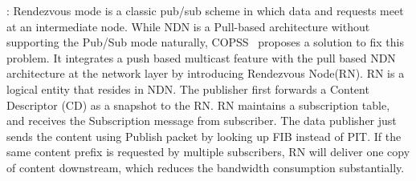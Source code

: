\vspace{1mm}: Rendezvous mode is a classic pub/sub scheme in which data and requests meet at an intermediate node. While NDN is a Pull-based architecture without supporting the Pub/Sub mode naturally,  COPSS~\cite{chen2011copss} proposes a solution to fix this problem. It integrates a push based multicast feature with the pull based NDN architecture at the network layer by introducing Rendezvous Node(RN). RN is a logical entity that resides in NDN. The publisher first forwards a Content Descriptor (CD) as a snapshot to the RN. RN maintains a subscription table, and receives the Subscription message from subscriber. The data publisher just sends the content using Publish packet by looking up FIB instead of PIT. If the same content prefix is requested by multiple subscribers, RN will deliver one copy  of content downstream, which reduces the bandwidth consumption substantially.

